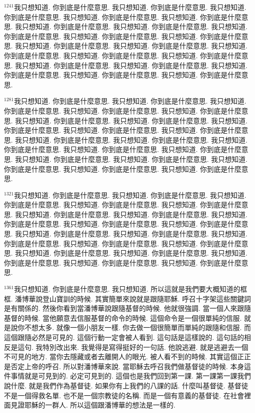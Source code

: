 \documentclass{book}
\begin{document}
$^{1241}$我只想知道.
你到底是什麼意思.
我只想知道.
你到底是什麼意思.
我只想知道.
你到底是什麼意思.
我只想知道.
你到底是什麼意思.
我只想知道.
你到底是什麼意思.
我只想知道.
你到底是什麼意思.
我只想知道.
你到底是什麼意思.
我只想知道.
你到底是什麼意思.
我只想知道.
你到底是什麼意思.
我只想知道.
你到底是什麼意思.
我只想知道.
你到底是什麼意思.
我只想知道.
你到底是什麼意思.
我只想知道.
你到底是什麼意思.
我只想知道.
你到底是什麼意思.
我只想知道.
你到底是什麼意思.
我只想知道.
你到底是什麼意思.
我只想知道.
你到底是什麼意思.
我只想知道.
你到底是什麼意思.
我只想知道.
你到底是什麼意思.
我只想知道.
你到底是什麼意思.

$^{1281}$我只想知道.
你到底是什麼意思.
我只想知道.
你到底是什麼意思.
我只想知道.
你到底是什麼意思.
我只想知道.
你到底是什麼意思.
我只想知道.
你到底是什麼意思.
我只想知道.
你到底是什麼意思.
我只想知道.
你到底是什麼意思.
我只想知道.
你到底是什麼意思.
我只想知道.
你到底是什麼意思.
我只想知道.
你到底是什麼意思.
我只想知道.
你到底是什麼意思.
我只想知道.
你到底是什麼意思.
我只想知道.
你到底是什麼意思.
我只想知道.
你到底是什麼意思.
我只想知道.
你到底是什麼意思.
我只想知道.
你到底是什麼意思.
我只想知道.
你到底是什麼意思.
我只想知道.
你到底是什麼意思.
我只想知道.
你到底是什麼意思.
我只想知道.
你到底是什麼意思.

$^{1321}$我只想知道.
你到底是什麼意思.
我只想知道.
你到底是什麼意思.
我只想知道.
你到底是什麼意思.
我只想知道.
你到底是什麼意思.
我只想知道.
你到底是什麼意思.
我只想知道.
你到底是什麼意思.
我只想知道.
你到底是什麼意思.
我只想知道.
你到底是什麼意思.
我只想知道.
你到底是什麼意思.
我只想知道.
你到底是什麼意思.
我只想知道.
你到底是什麼意思.
我只想知道.
你到底是什麼意思.
我只想知道.
你到底是什麼意思.
我只想知道.
你到底是什麼意思.
我只想知道.
你到底是什麼意思.
我只想知道.
你到底是什麼意思.
我只想知道.
你到底是什麼意思.
我只想知道.
你到底是什麼意思.
我只想知道.
你到底是什麼意思.
我只想知道.
你到底是什麼意思.

$^{1361}$我只想知道.
你到底是什麼意思.
我只想知道.
所以這就是我們要大概知道的框框.
潘博華說登山寶訓的時候.
其實簡單來說就是跟隨耶穌.
呼召十字架這些關鍵詞是有關係的.
然後你看到當潘博華說跟隨基督的時候.
他就很強調.
當一個人來跟隨基督的時候.
當他願意去信服基督的命令的時候.
這個命令是一個很單純的信服.
就是說你不想太多.
就像一個小朋友一樣.
你去做一個很簡單而單純的跟隨和信服.
而這個跟隨必然是可見的.
這個行動一定會被人看到.
這句話是這樣說的.
這句話的相反是這句.
我特別改出來.
我覺得是寫得挺好的一句話.
他說逃避.
就是逃避去一個不可見的地方.
當你去隱藏或者去離開人的眼光.
被人看不到的時候.
其實這個正正是否定上帝的呼召.
所以對潘博華來說.
當耶穌去呼召我們做基督徒的時候.
本身這件事情就是可見到的.
必定可見到的.
這個也是我們回到第一課.
第一課第一課我們說什麼.
就是我們作為基督徒.
如果你有上我們的八課的話.
什麼叫基督徒.
基督徒不是一個得救名單.
也不是一個宗教徒的名稱.
而是一個有意義的基督徒.
在社會裡面見證耶穌的一群人.
所以這個跟潘博華的想法是一樣的.
\end{document}
